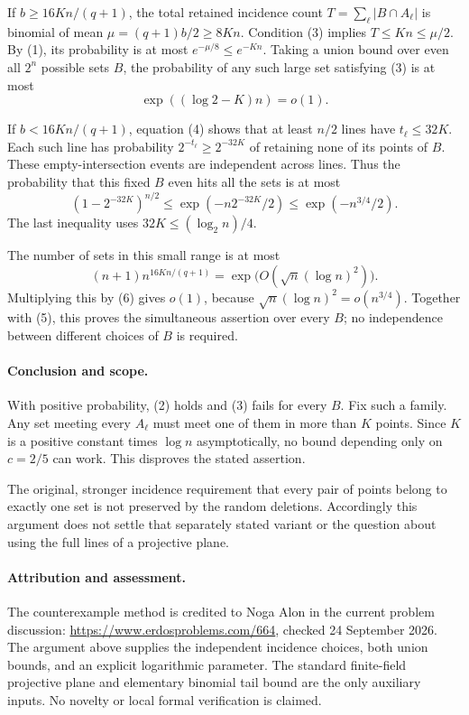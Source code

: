If \(b\geq16Kn/(q+1)\), the total retained incidence count
\(T=\sum_\ell|B\cap A_\ell|\) is binomial of mean \(\mu=(q+1)b/2\geq8Kn\). Condition (3) implies \(T\leq Kn\leq\mu/2\). By (1), its probability is at most \(e^{-\mu/8}\leq e^{-Kn}\). Taking a union bound over even all \(2^n\) possible sets \(B\), the probability of any such large set satisfying (3) is at most
\[
 \exp((\log2-K)n)=o(1). \tag{5}
\]

If \(b<16Kn/(q+1)\), equation (4) shows that at least \(n/2\) lines have \(t_\ell\leq32K\). Each such line has probability \(2^{-t_\ell}\geq2^{-32K}\) of retaining none of its points of \(B\). These empty-intersection events are independent across lines. Thus the probability that this fixed \(B\) even hits all the sets is at most
\[
 (1-2^{-32K})^{n/2}
 \leq\exp(-n2^{-32K}/2)
 \leq\exp(-n^{3/4}/2). \tag{6}
\]
The last inequality uses \(32K\leq(\log_2 n)/4\).

The number of sets in this small range is at most
\[
 (n+1)n^{16Kn/(q+1)}
 =\exp\bigl(O(\sqrt n(\log n)^2)\bigr).
\]
Multiplying this by (6) gives \(o(1)\), because \(\sqrt n(\log n)^2=o(n^{3/4})\). Together with (5), this proves the simultaneous assertion over every \(B\); no independence between different choices of \(B\) is required.

\paragraph{Conclusion and scope.}
With positive probability, (2) holds and (3) fails for every \(B\). Fix such a family. Any set meeting every \(A_\ell\) must meet one of them in more than \(K\) points. Since \(K\) is a positive constant times \(\log n\) asymptotically, no bound depending only on \(c=2/5\) can work. This disproves the stated assertion.

The original, stronger incidence requirement that every pair of points belong to exactly one set is not preserved by the random deletions. Accordingly this argument does not settle that separately stated variant or the question about using the full lines of a projective plane.

\paragraph{Attribution and assessment.}
The counterexample method is credited to Noga Alon in the current problem discussion: \url{https://www.erdosproblems.com/664}, checked 24 September 2026. The argument above supplies the independent incidence choices, both union bounds, and an explicit logarithmic parameter. The standard finite-field projective plane and elementary binomial tail bound are the only auxiliary inputs. No novelty or local formal verification is claimed.
